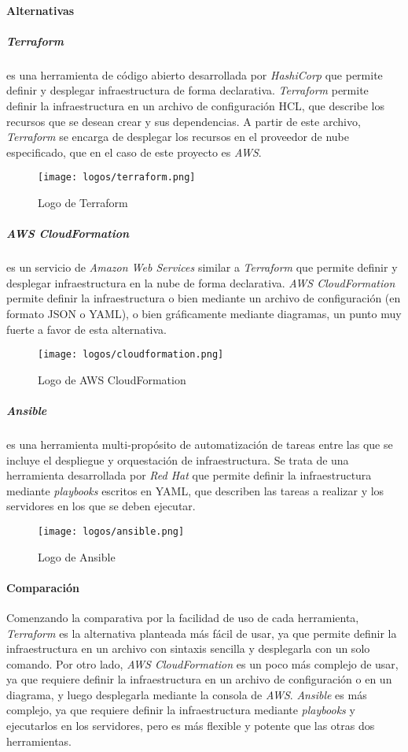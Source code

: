 \paragraph{Alternativas}
\subparagraph{Terraform} es una herramienta de código abierto desarrollada por
\textit{HashiCorp} que permite definir y desplegar infraestructura de forma
declarativa. \textit{Terraform} permite definir la infraestructura en un archivo
de configuración HCL, que describe los recursos que se desean crear y sus
dependencias. A partir de este archivo, \textit{Terraform} se encarga de
desplegar los recursos en el proveedor de nube especificado, que en el caso de
este proyecto es \textit{AWS}.

\begin{figure}[H]
	\centering
	\texttt{[image: logos/terraform.png]}
	\caption{Logo de Terraform~\textregistered}
	\label{fig:terraform}
\end{figure}

\subparagraph{AWS CloudFormation} es un servicio de \textit{Amazon Web Services}
similar a \textit{Terraform} que permite definir y desplegar infraestructura en
la nube de forma declarativa. \textit{AWS CloudFormation} permite definir la
infraestructura o bien mediante un archivo de configuración (en formato JSON o
YAML), o bien gráficamente mediante diagramas, un punto muy fuerte a favor de
esta alternativa.

\begin{figure}[H]
	\centering
	\texttt{[image: logos/cloudformation.png]}
	\caption{Logo de AWS CloudFormation~\textregistered}
	\label{fig:cloudformation}
\end{figure}

\subparagraph{Ansible} es una herramienta multi-propósito de automatización de tareas
entre las que se incluye el despliegue y orquestación de infraestructura. Se
trata de una herramienta desarrollada por \textit{Red Hat} que permite definir
la infraestructura mediante \textit{playbooks} escritos en YAML, que describen
las tareas a realizar y los servidores en los que se deben ejecutar.

\begin{figure}[H]
	\centering
	\texttt{[image: logos/ansible.png]}
	\caption{Logo de Ansible~\textregistered}
	\label{fig:ansible}
\end{figure}

\paragraph{Comparación}
Comenzando la comparativa por la facilidad de uso de cada herramienta,
\textit{Terraform} es la alternativa planteada más fácil de usar, ya que permite
definir la infraestructura en un archivo con sintaxis sencilla y desplegarla con
un solo comando. Por otro lado, \textit{AWS CloudFormation} es un poco más
complejo de usar, ya que requiere definir la infraestructura en un archivo de
configuración o en un diagrama, y luego desplegarla mediante la consola de
\textit{AWS}. \textit{Ansible} es más complejo, ya que requiere definir
la infraestructura mediante \textit{playbooks} y ejecutarlos en los servidores,
pero es más flexible y potente que las otras dos herramientas.

